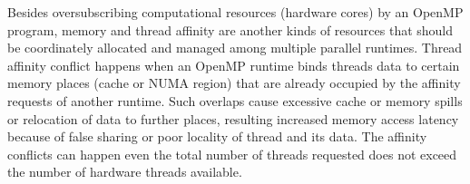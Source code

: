 Besides oversubscribing computational resources (hardware cores) by an OpenMP program, 
memory and thread affinity are another kinds of resources that should be coordinately allocated and managed among
multiple parallel runtimes. %
Thread affinity conflict happens when an OpenMP runtime binds threads data to 
certain memory places (cache or NUMA region) that are already occupied by 
the affinity requests of another runtime. Such overlaps cause excessive cache or memory spills or relocation of data
to further places, resulting increased memory access latency because of false sharing or 
poor locality of thread and its data. %
The affinity conflicts can happen even the total number of threads requested does not exceed the number of hardware threads available.

